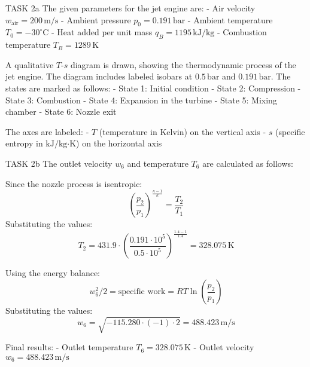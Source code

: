 TASK 2a  
The given parameters for the jet engine are:  
- Air velocity \( w_{\text{air}} = 200 \, \text{m/s} \)  
- Ambient pressure \( p_0 = 0.191 \, \text{bar} \)  
- Ambient temperature \( T_0 = -30^\circ\text{C} \)  
- Heat added per unit mass \( q_B = 1195 \, \text{kJ/kg} \)  
- Combustion temperature \( T_B = 1289 \, \text{K} \)  

A qualitative \( T \)-\( s \) diagram is drawn, showing the thermodynamic process of the jet engine. The diagram includes labeled isobars at \( 0.5 \, \text{bar} \) and \( 0.191 \, \text{bar} \). The states are marked as follows:  
- State 1: Initial condition  
- State 2: Compression  
- State 3: Combustion  
- State 4: Expansion in the turbine  
- State 5: Mixing chamber  
- State 6: Nozzle exit  

The axes are labeled:  
- \( T \) (temperature in Kelvin) on the vertical axis  
- \( s \) (specific entropy in \( \text{kJ}/\text{kg·K} \)) on the horizontal axis  

TASK 2b  
The outlet velocity \( w_6 \) and temperature \( T_6 \) are calculated as follows:  

Since the nozzle process is isentropic:  
\[
\left( \frac{p_2}{p_1} \right)^{\frac{\kappa - 1}{\kappa}} = \frac{T_2}{T_1}
\]  
Substituting the values:  
\[
T_2 = 431.9 \cdot \left( \frac{0.191 \cdot 10^5}{0.5 \cdot 10^5} \right)^{\frac{1.4 - 1}{1.4}} = 328.075 \, \text{K}
\]  

Using the energy balance:  
\[
w_6^2 / 2 = \text{specific work} = R T \ln \left( \frac{p_2}{p_1} \right)
\]  
Substituting the values:  
\[
w_6 = \sqrt{-115.280 \cdot (-1) \cdot 2} = 488.423 \, \text{m/s}
\]  

Final results:  
- Outlet temperature \( T_6 = 328.075 \, \text{K} \)  
- Outlet velocity \( w_6 = 488.423 \, \text{m/s} \)  

